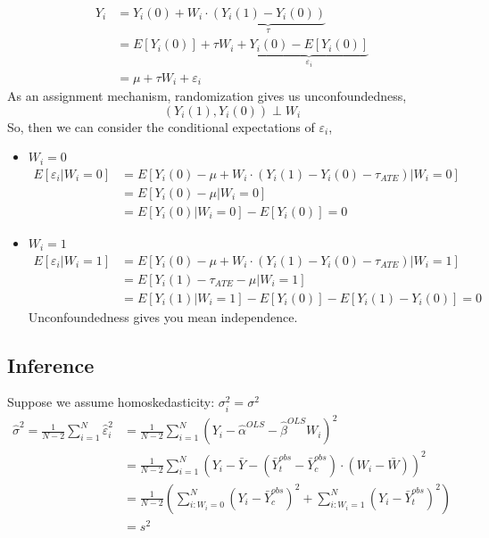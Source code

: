 \documentclass[
  letterpaper,
  DIV=11,
  numbers=noendperiod]{scrreprt}
\providecommand{\tightlist}{%
  \setlength{\itemsep}{0pt}\setlength{\parskip}{0pt}}\usepackage{longtable,booktabs,array}
\theoremstyle{definition}
\theoremstyle{remark}
\begin{document}
\[
\begin{align}
            Y_i &= Y_i(0)+W_i\cdot\underbrace{(Y_i(1)-Y_i(0))}_{\tau} \\
                &=E[Y_i(0)]+\tau W_i+\underbrace{Y_i(0)-E[Y_i(0)]}_{\varepsilon_i} \\
                &=\mu+\tau W_i + \varepsilon_i
\end{align}
\] As an assignment mechanism, randomization gives us unconfoundedness,
\[
            (Y_i(1),Y_i(0))\perp W_i
\] So, then we can consider the conditional expectations of
\(\varepsilon_i\),

\par

\begin{itemize}
\tightlist
\item
  \textbf{\(W_i=0\)} \[
          \begin{align*}
              E[\varepsilon_i|W_i=0] &= E[Y_i(0)- \mu + W_i\cdot(Y_i(1)-Y_i(0)-\tau_{ATE})|W_i=0] \\
              &= E[Y_i(0)- \mu|W_i=0] \\
              &=E[Y_i(0)|W_i=0]-E[Y_i(0)] = 0
          \end{align*}
  \]
\item
  \textbf{\(W_i=1\)} \[
          \begin{align*}
              E[\varepsilon_i|W_i=1] &= E[Y_i(0)- \mu + W_i\cdot(Y_i(1)-Y_i(0)-\tau_{ATE})|W_i=1] \\
              &= E[Y_i(1)-\tau_{ATE} - \mu|W_i=1] \\
              &=E[Y_i(1)|W_i=1]-E[Y_i(0)]-E[Y_i(1)-Y_i(0)] = 0
          \end{align*}
  \] Unconfoundedness gives you mean independence.
\end{itemize}

\hypertarget{inference}{%
\subsection{Inference}\label{inference}}

Suppose we assume homoskedasticity: \(\sigma_i^2=\sigma^2\)\\
\[
        \begin{align*}
            \hat{\sigma}^2 = \frac{1}{N-2}\sum_{i=1}^N \hat{\varepsilon}_i^2&= \frac{1}{N-2}\sum_{i=1}^N  (Y_i-\hat{\alpha}^{OLS}-\hat{\beta}^{OLS}W_i)^2 \\
            &=\frac{1}{N-2}\sum_{i=1}^N  \left(Y_i-\bar{Y}-(\bar{Y}^{obs}_t-\bar{Y}^{obs}_c)\cdot(W_i-\bar{W})\right)^2 \\
            &=\frac{1}{N-2}\left(\sum_{i:W_i=0}^N(Y_i-\bar{Y}^{obs}_c)^2+\sum_{i:W_i=1}^N(Y_i-\bar{Y}^{obs}_t)^2\right) \\
            &=s^2
        \end{align*}
\]
\end{document}
